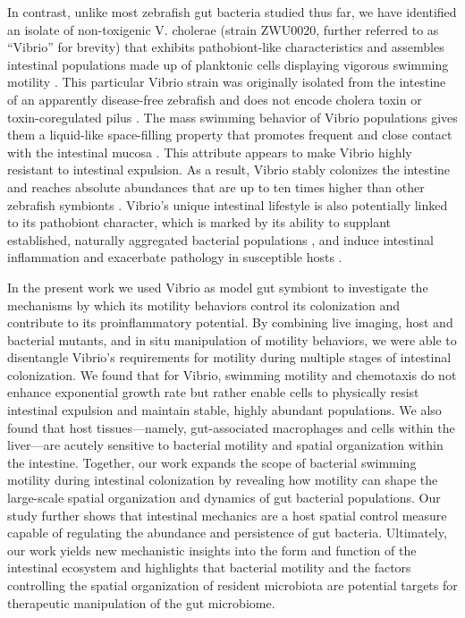In contrast, unlike most zebrafish gut bacteria studied thus far, we have identified an isolate of non-toxigenic V. cholerae (strain ZWU0020, further referred to as ``Vibrio'' for brevity) that exhibits pathobiont-like characteristics and assembles intestinal populations made up of planktonic cells displaying vigorous swimming motility \cite{wiles_host_2016,rolig_enteric_2017}. This particular Vibrio strain was originally isolated from the intestine of an apparently disease-free zebrafish and does not encode cholera toxin or toxin-coregulated pilus \cite{stephens_composition_2016}. The mass swimming behavior of Vibrio populations gives them a liquid-like space-filling property that promotes frequent and close contact with the intestinal mucosa \cite{wiles_host_2016}. This attribute appears to make Vibrio highly resistant to intestinal expulsion. As a result, Vibrio stably colonizes the intestine and reaches absolute abundances that are up to ten times higher than other zebrafish symbionts \cite{schlomann_sublethal_2019}. Vibrio's unique intestinal lifestyle is also potentially linked to its pathobiont character, which is marked by its ability to supplant established, naturally aggregated bacterial populations \cite{wiles_host_2016}, and induce intestinal inflammation and exacerbate pathology in susceptible hosts \cite{rolig_enteric_2017,rolig_individual_2015}. 

In the present work we used Vibrio as model gut symbiont to investigate the mechanisms by which its motility behaviors control its colonization and contribute to its proinflammatory potential. By combining live imaging, host and bacterial mutants, and in situ manipulation of motility behaviors, we were able to disentangle Vibrio's requirements for motility during multiple stages of intestinal colonization. We found that for Vibrio, swimming motility and chemotaxis do not enhance exponential growth rate but rather enable cells to physically resist intestinal expulsion and maintain stable, highly abundant populations. We also found that host tissues—namely, gut-associated macrophages and cells within the liver—are acutely sensitive to bacterial motility and spatial organization within the intestine. Together, our work expands the scope of bacterial swimming motility during intestinal colonization by revealing how motility can shape the large-scale spatial organization and dynamics of gut bacterial populations. Our study further shows that intestinal mechanics are a host spatial control measure capable of regulating the abundance and persistence of gut bacteria. Ultimately, our work yields new mechanistic insights into the form and function of the intestinal ecosystem and highlights that bacterial motility and the factors controlling the spatial organization of resident microbiota are potential targets for therapeutic manipulation of the gut microbiome.

